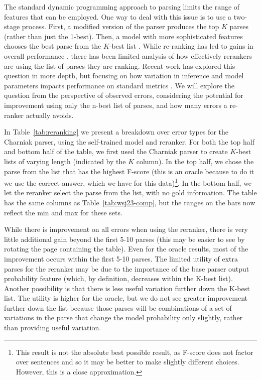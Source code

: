 The standard dynamic programming approach to parsing limits the range of features that can be employed.
One way to deal with this issue is to use a two-stage process.
First, a modified version of the parser produces the top $K$ parses (rather than just the 1-best).
Then, a model with more sophisticated features chooses the best parse from the $K$-best list \parencite{collins:00}.
While re-ranking has led to gains in overall performance \parencite{Charniak-Johnson:2005}, there has been limited analysis of how effectively rerankers are using the list of parses they are ranking.
Recent work has explored this question in more depth, but focusing on how variation in inference and model parameters impacts performance on standard metrics \parencite{huang:08a,Ng-etal:2010,Auli-Lopez:2011,Ng-Curran:2012}.
We will explore the question from the perspective of observed errors, considering the potential for improvement using only the n-best list of parses, and how many errors a re-ranker actually avoids.

\begin{landscape}

\end{landscape}

In Table~\ref{tab:reranking} we present a breakdown over error types for the Charniak parser, using the self-trained model and reranker.
For both the top half and bottom half of the table, we first used the Charniak parser to create $K$-best lists of varying length (indicated by the $K$ column).
In the top half, we chose the parse from the list that has the highest F-score (this is an oracle because to do it we use the correct answer, which we have for this data)\footnote{
This result is not the absolute best possible result, as F-score does not factor over sentences and so it may be better to make slightly different choices. However, this is a close approximation.
}.
In the bottom half, we let the \textcite{Charniak-Johnson:2005} reranker select the parse from the list, with no gold information.
The table has the same columns as Table~\ref{tab:wsj23-comp}, but the ranges on the bars now reflect the min and max for these sets.

While there is improvement on all errors when using the reranker, there is very little additional gain beyond the first 5-10 parses (this may be easier to see by rotating the page containing the table).
Even for the oracle
results, most of the improvement occurs within the first 5-10 parses.  The
limited utility of extra parses for the reranker may be due to the importance
of the base parser output probability feature (which, by definition, decreases
within the K-best list).
Another possibility is that there is less useful variation further down the K-best list.
The utility is higher for the oracle, but we do not see greater improvement further down the list because those parses will be combinations of a set of variations in the parse that change the model probability only slightly, rather than providing useful variation.

